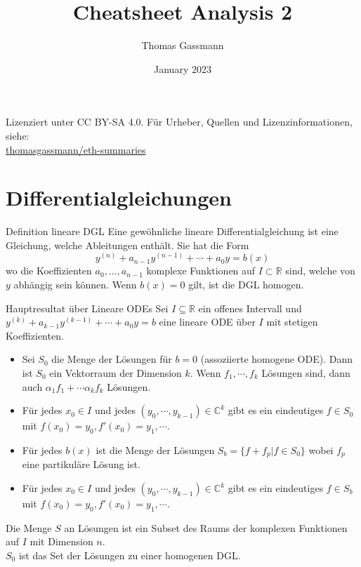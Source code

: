\documentclass[a4paper,10pt]{article}
\title{Cheatsheet Analysis 2}
\author{Thomas Gassmann}
\date{January 2023}
\def\R{\mathbb{R}}
\begin{document}
\begin{center}
    Lizenziert unter CC BY-SA 4.0. Für Urheber, Quellen und Lizenzinformationen, siehe:\\
    \href{https://github.com/thomasgassmann/eth-summaries}{thomasgassmann/eth-summaries}
  \end{center}

\section{Differentialgleichungen}
\begin{mainbox}{Definition lineare DGL}
  Eine gewöhnliche lineare Differentialgleichung ist eine Gleichung, welche Ableitungen enthält. Sie hat die Form \[y^{(n)} + a_{n-1} y^{(n-1)} + \cdots + a_0y = b(x)\]
  wo die Koeffizienten \(a_0, \ldots, a_{n-1}\) komplexe Funktionen auf \(I \subset \R\) sind, welche von \(y\) abhängig sein können. Wenn \(b(x) = 0\) gilt, ist die DGL homogen.
\end{mainbox}

\begin{subbox}{Hauptresultat über Lineare ODEs}
  Sei $I \subseteq \mathbb{R}$ ein offenes Intervall und $y^{(k)} + a_{k-1} y^{(k-1)} + \cdots + a_0 y = b$ eine lineare ODE über $I$ mit stetigen Koeffizienten.
  \begin{itemize}
    \item Sei $S_0$ die Menge der Lösungen für $b = 0$ (assoziierte homogene ODE). Dann ist $S_0$ ein Vektorraum der Dimension $k$. Wenn $f_1, \cdots, f_k$ Lösungen sind, dann auch $\alpha_1 f_1 + \cdots \alpha_k f_k$ Lösungen.
    \item Für jedes $x_0 \in I$ und jedes $(y_0, \cdots, y_{k-1}) \in \mathbb{C}^k$ gibt es ein eindeutiges $f \in S_0$ mit $f(x_0) = y_0, f'(x_0) = y_1, \cdots$.
    \item Für jedes $b(x)$ ist die Menge der Lösungen $S_b = \{f + f_p | f \in S_0\}$ wobei $f_p$ eine partikuläre Lösung ist.
    \item Für jedes $x_0 \in I$ und jedes $(y_0, \cdots, y_{k-1}) \in \mathbb{C}^k$ gibt es ein eindeutiges $f \in S_b$ mit $f(x_0) = y_0, f'(x_0) = y_1, \cdots$.
  \end{itemize}
\end{subbox}

Die Menge $S$ an Lösungen ist ein Subset des Raums der komplexen Funktionen auf $I$ mit Dimension $n$.\\
\(S_0\) ist das Set der Lösungen zu einer homogenen DGL.
\end{document}
